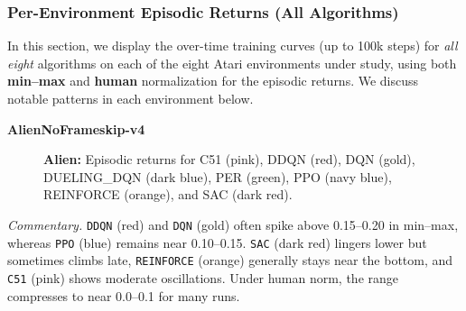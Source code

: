 \subsubsection{Per-Environment Episodic Returns (All Algorithms)}
\label{sssec:per_env_all}

In this section, we display the over-time training curves (up to 100k steps) for 
\emph{all eight} algorithms on each of the eight Atari environments under study, 
using both \textbf{min--max} and \textbf{human} normalization for the episodic returns. 
We discuss notable patterns in each environment below.

\noindent
\textbf{AlienNoFrameskip-v4}
\begin{figure}[htbp]
	\centering
	\quad
	\caption{\textbf{Alien:} Episodic returns for C51 (pink), DDQN (red), 
		DQN (gold), DUELING\_DQN (dark blue), PER (green),
		PPO (navy blue), REINFORCE (orange), and SAC (dark red).}
	\label{fig:alien_comparison_combined}
\end{figure}

\noindent
\emph{Commentary.} 
\texttt{DDQN} (red) and \texttt{DQN} (gold) often spike above 0.15--0.20 in min--max, 
whereas \texttt{PPO} (blue) remains near 0.10--0.15. 
\texttt{SAC} (dark red) lingers lower but sometimes climbs late, 
\texttt{REINFORCE} (orange) generally stays near the bottom, and \texttt{C51} (pink) 
shows moderate oscillations. 
Under human norm, the range compresses to near 0.0--0.1 for many runs.

